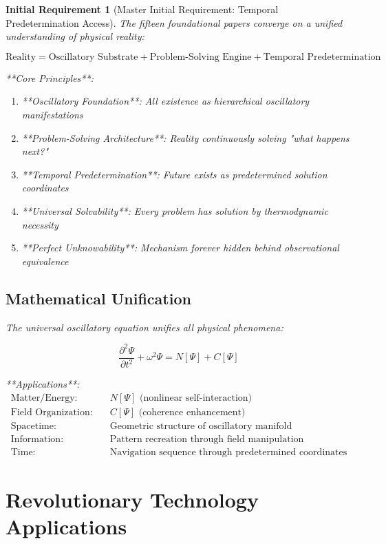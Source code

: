 \documentclass[12pt,a4paper]{article}
\newtheorem{requirement}[theorem]{Initial Requirement}
\theoremstyle{remark}
\begin{document}
\begin{requirement}[Master Initial Requirement: Temporal Predetermination Access]
The fifteen foundational papers converge on a unified understanding of physical reality:

\begin{equation}
\text{Reality} = \text{Oscillatory Substrate} + \text{Problem-Solving Engine} + \text{Temporal Predetermination}
\end{equation}

**Core Principles**:
\begin{enumerate}
\item **Oscillatory Foundation**: All existence as hierarchical oscillatory manifestations
\item **Problem-Solving Architecture**: Reality continuously solving "what happens next?"
\item **Temporal Predetermination**: Future exists as predetermined solution coordinates
\item **Universal Solvability**: Every problem has solution by thermodynamic necessity
\item **Perfect Unknowability**: Mechanism forever hidden behind observational equivalence
\end{enumerate}

\subsection{Mathematical Unification}

The universal oscillatory equation unifies all physical phenomena:

\begin{equation}
\frac{\partial^2\Psi}{\partial t^2} + \omega^2\Psi = N[\Psi] + C[\Psi]
\end{equation}

**Applications**:
\begin{align}
\text{Matter/Energy:} &\quad N[\Psi] \text{ (nonlinear self-interaction)} \\
\text{Field Organization:} &\quad C[\Psi] \text{ (coherence enhancement)} \\
\text{Spacetime:} &\quad \text{Geometric structure of oscillatory manifold} \\
\text{Information:} &\quad \text{Pattern recreation through field manipulation} \\
\text{Time:} &\quad \text{Navigation sequence through predetermined coordinates}
\end{align}

\section{Revolutionary Technology Applications}


\end{requirement}
\end{document}
